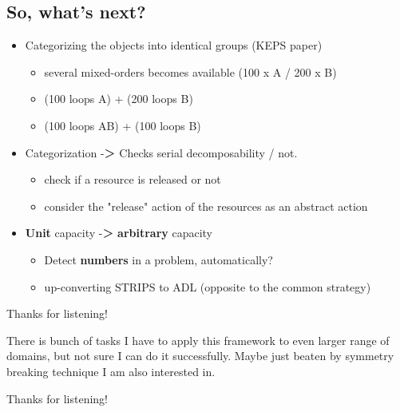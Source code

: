 \subsection{So, what's next?}
\label{sec-10-2}

\begin{itemize}
\item Categorizing the objects into identical groups (KEPS paper)
\begin{itemize}
\item several mixed-orders becomes available (100 x A / 200 x B)
\item (100 loops A) + (200 loops B)
\item (100 loops AB) + (100 loops B)
\end{itemize}
\item Categorization -＞ Checks serial decomposability / not.
\begin{itemize}
\item check if a resource is released or not
\item consider the "release" action of the resources as an abstract action
\end{itemize}
\item \textbf{Unit} capacity -＞ \textbf{arbitrary} capacity
\begin{itemize}
\item Detect \textbf{numbers} in a problem, automatically?
\item up-converting STRIPS to ADL (opposite to the common strategy)
\end{itemize}
\end{itemize}

Thanks for listening!

\begin{resume}
There is bunch of tasks I have to apply this framework to even larger range of
domains, but not sure I can do it successfully. Maybe just beaten by symmetry
breaking technique I am also interested in. 

Thanks for listening!
\end{resume}
